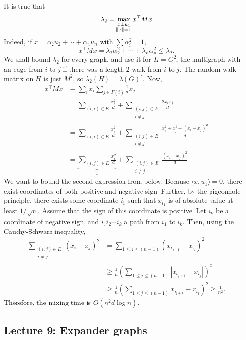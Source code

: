 			It is true that
			\[ \lambda_2 = \max_{\substack{x \perp u_1 \\ \norm{x} = 1}} x^\top M x \]
			Indeed, if $x = \alpha_2 u_2 + \cdots + \alpha_n u_n$ with $\sum \alpha_i^2 = 1$,
			\[ x^\top M x = \lambda_2 \alpha_2^2 + \cdots + \lambda_n \alpha_n^2 \le \lambda_2. \]
			We shall bound $\lambda_2$ for every graph, and use it for $H = G^2$, the multigraph with an edge from $i$ to $j$ if there was a length $2$ walk from $i$ to $j$. The random walk matrix on $H$ is just $M^2$, so $\lambda_2(H) = \lambda(G)^2$. Now,
			\begin{align*}
				x^\top M x &= \sum_i x_i \sum_{j \in \Gamma(i)} \frac{1}{d} x_j \\
					&= \sum_{(i,i) \in E} \frac{x_i^2}{d} + \sum_{\substack{(i,j) \in E \\ i \ne j}} \frac{2x_ix_j}{d} \\
					&= \sum_{(i,i) \in E} \frac{x_i^2}{d} + \sum_{\substack{(i,j) \in E \\ i \ne j}} \frac{x_i^2 + x_j^2 - (x_i - x_j)^2}{d} \\
					&= \underbrace{\sum_{(i,j) \in E} \frac{x_i^2}{d}}_{1} + \sum_{\substack{(i,j) \in E \\ i \ne j}} \frac{(x_i-x_j)^2}{d}.
			\end{align*}
			We want to bound the second expression from below. Because $\langle x,u_1\rangle = 0$, there exist coordinates of both positive and negative sign. Further, by the pigeonhole principle, there exists some coordinate $i_1$ such that $x_{i_1}$ is of absolute value at least $1/\sqrt{n}$. Assume that the sign of this coordinate is positive. Let $i_k$ be a coordinate of negative sign, and $i_1 i_2 \cdots i_k$ a path from $i_1$ to $i_k$. Then, using the Cauchy-Schwarz inequality,
			\begin{align*}
				\sum_{\substack{(i,j) \in E \\ i \ne j}} (x_i-x_j)^2 &= \sum_{1 \le j \le (n-1)} (x_{i_{j+1}} - x_{i_{j}})^2 \\
					&\ge \frac{1}{n} \left(\sum_{1 \le j \le (n-1)} |x_{i_{j+1}} - x_{i_j}|\right)^2 \\
					&\ge \frac{1}{n} \left(\sum_{1 \le j \le (n-1)} x_{i_{j+1}} - x_{i_j}\right)^2 \ge \frac{1}{n^2}.
			\end{align*}
			Therefore, the mixing time is $O\left(n^2 d \log n \right)$.

	\subsection{Lecture 9: Expander graphs}

